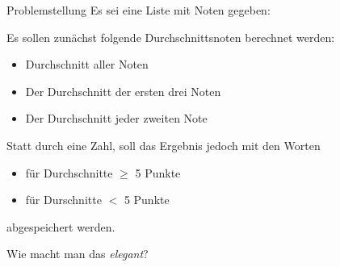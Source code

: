 \begin{frame}
\begin{block}{Problemstellung}
	\vspace{2pt}
	Es sei eine Liste mit Noten gegeben: 
	
	
	\pause
	Es sollen zunächst folgende Durchschnittsnoten berechnet werden: 
	\begin{itemize}
		\item Durchschnitt aller Noten
		\item Der Durchschnitt der ersten drei Noten
		\item Der Durchschnitt jeder zweiten Note
	\end{itemize}
\pause 
	Statt durch eine Zahl, soll das Ergebnis jedoch mit den Worten  
	\begin{itemize}
		\item {} für Durchschnitte $\geq$ 5 Punkte
		\item {} für Durschnitte $<$ 5 Punkte 
	\end{itemize}

	abgespeichert werden. 
	
	
	\pause 
	
	\vspace{8pt}
	
	Wie macht man das \emph{elegant}? 
\end{block}
\end{frame}

